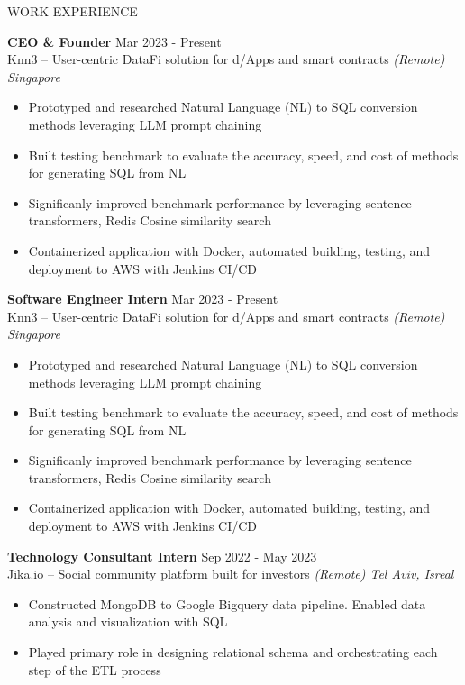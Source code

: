 \documentclass{cv} %
\begin{document}
\begin{rSection}{WORK EXPERIENCE}

  \textbf{CEO \& Founder} \hfill Mar 2023 - Present\\
	Knn3 – User-centric DataFi solution for d/Apps and smart contracts  \hfill \textit{(Remote) Singapore}
	\begin{itemize}
		\item Prototyped and researched Natural Language (NL) to SQL conversion methods leveraging LLM prompt chaining
		\item Built testing benchmark to evaluate the accuracy, speed, and cost of methods for generating SQL from NL
		\item Significanly improved benchmark performance by leveraging sentence transformers, Redis Cosine similarity search
		\item Containerized application with Docker, automated building, testing, and deployment to AWS with Jenkins CI/CD
	\end{itemize}

	\textbf{Software Engineer Intern} \hfill Mar 2023 - Present\\
	Knn3 – User-centric DataFi solution for d/Apps and smart contracts  \hfill \textit{(Remote) Singapore}
	\begin{itemize}
		\item Prototyped and researched Natural Language (NL) to SQL conversion methods leveraging LLM prompt chaining
		\item Built testing benchmark to evaluate the accuracy, speed, and cost of methods for generating SQL from NL
		\item Significanly improved benchmark performance by leveraging sentence transformers, Redis Cosine similarity search
		\item Containerized application with Docker, automated building, testing, and deployment to AWS with Jenkins CI/CD
	\end{itemize}

	\textbf{Technology Consultant Intern} \hfill Sep 2022 - May 2023\\
	Jika.io – Social community platform built for investors \hfill \textit{(Remote) Tel Aviv, Isreal}
	\begin{itemize}
		\item Constructed MongoDB to Google Bigquery data pipeline. Enabled data analysis and visualization with SQL
		\item Played primary role in designing relational schema and orchestrating each step of the ETL process
	\end{itemize}


\end{rSection}
\end{document}
